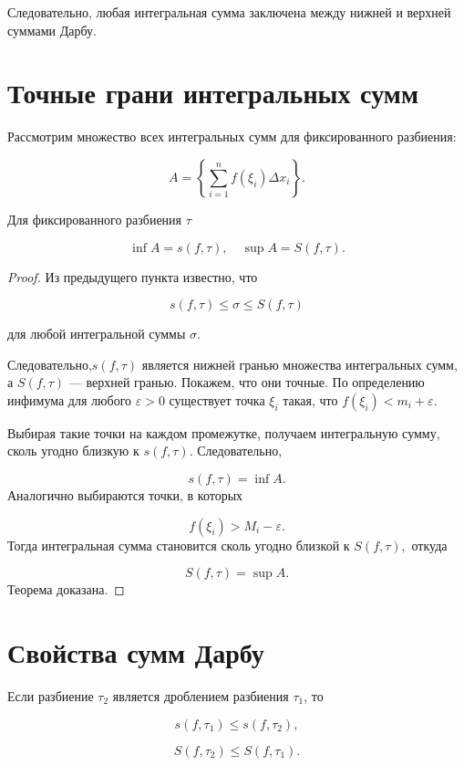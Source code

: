 \documentclass[14pt]{extreport}
\begin{document}
Следовательно, любая интегральная сумма заключена между нижней и верхней суммами Дарбу.

\section{Точные грани интегральных сумм}

Рассмотрим множество всех интегральных сумм для фиксированного разбиения:

\[
A=
\left\{
\sum_{i=1}^{n}
f(\xi_i)\Delta x_i
\right\}.
\]

\begin{theorem}
Для фиксированного разбиения $\tau$

\[
\inf A=s(f,\tau),\quad \sup A=S(f,\tau).
\]
\end{theorem}

\begin{proof}

Из предыдущего пункта известно, что

\[
s(f,\tau)
\le
\sigma
\le
S(f,\tau)
\]

для любой интегральной суммы $\sigma$.

Следовательно,$ s(f,\tau)$
является нижней гранью множества интегральных сумм,
а $S(f,\tau)$
— верхней гранью.
Покажем, что они точные.
По определению инфимума для любого $\varepsilon>0$
существует точка $\xi_i$
такая, что $f(\xi_i)<m_i+\varepsilon.$

Выбирая такие точки на каждом промежутке,
получаем интегральную сумму, сколь угодно близкую к $s(f,\tau).$ Следовательно,

\[
s(f,\tau)
=
\inf A.
\]
Аналогично выбираются точки, в которых

\[
f(\xi_i)>M_i-\varepsilon.
\]
Тогда интегральная сумма становится сколь угодно близкой к $S(f,\tau),$
откуда

\[
S(f,\tau)
=
\sup A.
\]
Теорема доказана.
\end{proof}

\section{Свойства сумм Дарбу}

\begin{theorem}
Если разбиение $\tau_2$ является дроблением разбиения $\tau_1$,
то

\[
s(f,\tau_1)
\le
s(f,\tau_2),
\]

\[
S(f,\tau_2)
\le
S(f,\tau_1).
\]
\end{theorem}
\end{document}
